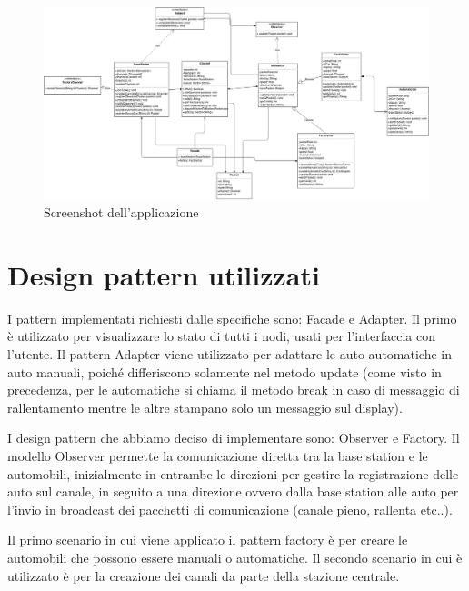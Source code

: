 \documentclass[a4paper,10pt]{article}
\begin{document}
\begin{figure}[htbp]
\includegraphics[scale=0.4]{class_diagram.jpg}
\caption{Screenshot dell'applicazione}
\label{class_dig}
\end{figure}

\section{Design pattern utilizzati}
I pattern implementati richiesti dalle specifiche sono: Facade e Adapter. Il primo è utilizzato per visualizzare lo stato di tutti i nodi, usati per l'interfaccia con l'utente. Il pattern Adapter viene utilizzato per adattare le auto automatiche in auto manuali, poiché differiscono solamente nel metodo update (come visto in precedenza, per le automatiche si chiama il metodo break in caso di messaggio di rallentamento mentre le altre stampano solo un messaggio sul display). 

I design pattern che abbiamo deciso di implementare sono: Observer e Factory. Il modello Observer permette la comunicazione diretta tra la base station e le automobili, inizialmente in entrambe le direzioni per gestire la registrazione delle auto sul canale, in seguito a una direzione ovvero dalla base station alle auto per l'invio in broadcast dei pacchetti di comunicazione (canale pieno, rallenta etc..).

Il primo scenario in cui viene applicato il pattern factory è per creare le automobili che possono essere manuali o automatiche. Il secondo scenario in cui è utilizzato è per la creazione dei canali da parte della stazione centrale.
\end{document}
